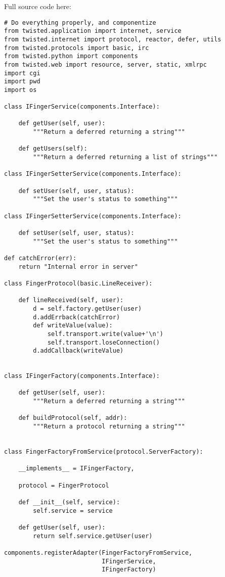  Full source code here: \begin{verbatim}
# Do everything properly, and componentize
from twisted.application import internet, service
from twisted.internet import protocol, reactor, defer, utils
from twisted.protocols import basic, irc
from twisted.python import components
from twisted.web import resource, server, static, xmlrpc
import cgi
import pwd
import os

class IFingerService(components.Interface):

    def getUser(self, user):
        """Return a deferred returning a string"""

    def getUsers(self):
        """Return a deferred returning a list of strings"""

class IFingerSetterService(components.Interface):

    def setUser(self, user, status):
        """Set the user's status to something"""

class IFingerSetterService(components.Interface):

    def setUser(self, user, status):
        """Set the user's status to something"""

def catchError(err):
    return "Internal error in server"

class FingerProtocol(basic.LineReceiver):

    def lineReceived(self, user):
        d = self.factory.getUser(user)
        d.addErrback(catchError)
        def writeValue(value):
            self.transport.write(value+'\n')
            self.transport.loseConnection()
        d.addCallback(writeValue)


class IFingerFactory(components.Interface):

    def getUser(self, user):
        """Return a deferred returning a string"""

    def buildProtocol(self, addr):
        """Return a protocol returning a string"""


class FingerFactoryFromService(protocol.ServerFactory):

    __implements__ = IFingerFactory,

    protocol = FingerProtocol

    def __init__(self, service):
        self.service = service

    def getUser(self, user):
        return self.service.getUser(user)

components.registerAdapter(FingerFactoryFromService,
                           IFingerService,
                           IFingerFactory)


\end{verbatim}
